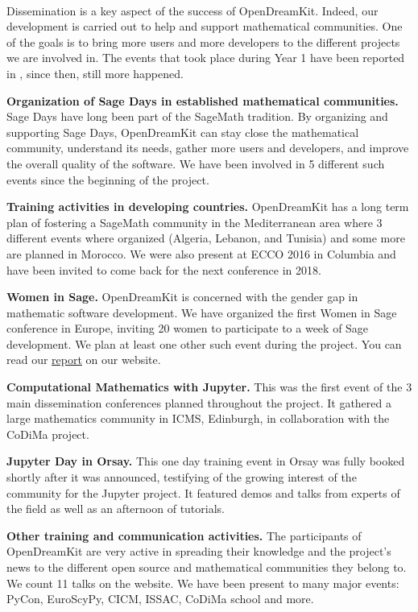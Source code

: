 \documentclass{deliverablereport}
\begin{document}
\paragraph{}

Dissemination is a key aspect of the success of OpenDreamKit. Indeed, our development is carried
out to help and support mathematical communities. One of the goals is to bring
more users and more developers to the different projects we are involved in. The events
that took place during Year 1 have been reported in , since then, still
more happened.

\begin{compactitem}
\item \textbf{Organization of Sage Days in established mathematical communities.} Sage Days have long been
part of the SageMath tradition. By organizing and supporting Sage Days, OpenDreamKit can stay close
the mathematical community, understand its needs, gather more users and developers, and improve
the overall quality of the software. We have been involved in 5 different such events since the beginning 
of the project.
\item \textbf{Training activities in developing countries.} OpenDreamKit has a long term plan of fostering
a SageMath community in the Mediterranean area where 3 different events where organized (Algeria, Lebanon, and Tunisia) 
and some more are planned in Morocco. We were also present at ECCO 2016 in Columbia and have been invited
to come back for the next conference in 2018. 
\item \textbf{Women in Sage.} OpenDreamKit is concerned with the gender gap in mathematic software development. 
We have organized the first Women in Sage conference in Europe, inviting 20 women to participate to a week of Sage development. We plan at least one other such event during the project. You can read our \href{http://opendreamkit.org/2017/04/06/WomenInSage/}{report} on our website.
\item \textbf{Computational Mathematics with Jupyter.} This was the first event of the 3 main dissemination conferences
planned throughout the project. It gathered a large mathematics community in ICMS, Edinburgh, in collaboration with the CoDiMa project.
\item \textbf{Jupyter Day in Orsay.} This one day training event in Orsay was fully booked shortly after it was announced, testifying of the growing interest of the community for the Jupyter project. It featured demos and talks from experts of the field as well as an afternoon of tutorials. 
\item \textbf{Other training and communication activities.} The participants of OpenDreamKit are very active
in spreading their knowledge and the project's news to the different open source
and mathematical communities they belong to. We count 11 talks on the
website. We have been present to many major events: PyCon, EuroScyPy, CICM, ISSAC, CoDiMa school and more. 
\end{compactitem}
\end{document}
